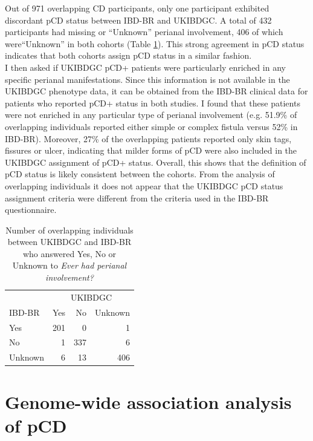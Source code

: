 Out of 971 overlapping CD participants, only one participant exhibited discordant pCD status between IBD-BR and UKIBDGC. A total of 432 participants had missing or “Unknown” perianal involvement, 406 of which were“Unknown” in both cohorts (Table \ref{table:cohort_pcd_agree}). This strong agreement in pCD status indicates that both cohorts assign pCD status in a similar fashion.\\

I then asked if UKIBDGC pCD+ patients were particularly enriched in any specific perianal manifestations. Since this information is not available in the UKIBDGC phenotype data, it can be obtained from the IBD-BR clinical data for patients who reported pCD+ status in both studies. I found that these patients were not enriched in any particular type of perianal involvement (e.g. 51.9\% of overlapping individuals reported either simple or complex fistula versus 52\% in IBD-BR). Moreover, 27\% of the overlapping patients reported only skin tags, fissures or ulcer, indicating that milder forms of pCD were also included in the UKIBDGC assignment of pCD+ status. Overall, this shows that the definition of pCD status is likely consistent between the cohorts. From the analysis of overlapping individuals it does not appear that the UKIBDGC pCD status assignment criteria were different from the criteria used in the IBD-BR questionnaire.


\begin{table}[htb]
  \caption{Number of overlapping individuals between UKIBDGC and IBD-BR who answered Yes, No or Unknown to \textit{Ever had perianal involvement?}}
  \label{table:cohort_pcd_agree}
  \centering
  \begin{tabular}[t]{|l|r|r|r|}
  \hline
  \multicolumn{1}{|c|}{ } & \multicolumn{3}{c|}{UKIBDGC} \\
  \cline{2-4}
  IBD-BR& Yes & No & Unknown\\
  \hline
  Yes & 201 & 0 & 1\\
  \hline
  No & 1 & 337 & 6\\
  \hline
  Unknown & 6 & 13 & 406\\
  \hline
  \end{tabular}
  \end{table}

  \section{Genome-wide association analysis of pCD}
